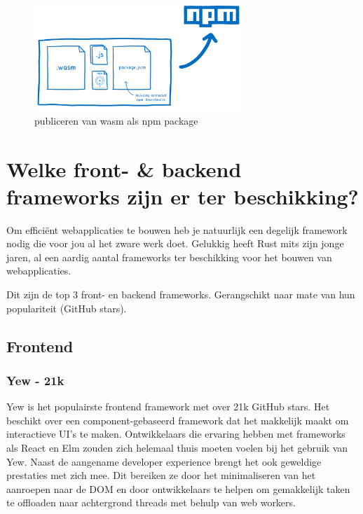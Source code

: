 \begin{figure}[h]
  \centering
  \includegraphics[width=0.7\textwidth]{figures/wasm_to_npm.png}
  \caption{publiceren van wasm als npm package}
\end{figure}




\clearpage

\section{Welke front- \& backend frameworks zijn er ter beschikking?}
\label{frameworks}

Om efficiënt webapplicaties te bouwen heb je natuurlijk een degelijk framework nodig die voor jou al
het zware werk doet. Gelukkig heeft Rust mits zijn jonge jaren, al een aardig aantal frameworks ter
beschikking voor het bouwen van webapplicaties.  

Dit zijn de top 3 front- en backend frameworks. Gerangschikt naar mate van hun populariteit (GitHub
stars).

\subsection{Frontend}

\subsubsection{Yew - 21k} 

Yew is het populairste frontend framework met over 21k GitHub stars. Het beschikt
over een component-gebaseerd framework dat het makkelijk maakt om interactieve UI’s te maken.
Ontwikkelaars die ervaring hebben met frameworks als React en Elm zouden zich helemaal thuis moeten
voelen bij het gebruik van Yew. Naast de aangename developer experience brengt het ook geweldige
prestaties met zich mee. Dit bereiken ze door het minimaliseren van het aanroepen naar de DOM en
door ontwikkelaars te helpen om gemakkelijk taken te offloaden naar achtergrond threads met behulp
van web workers. 

